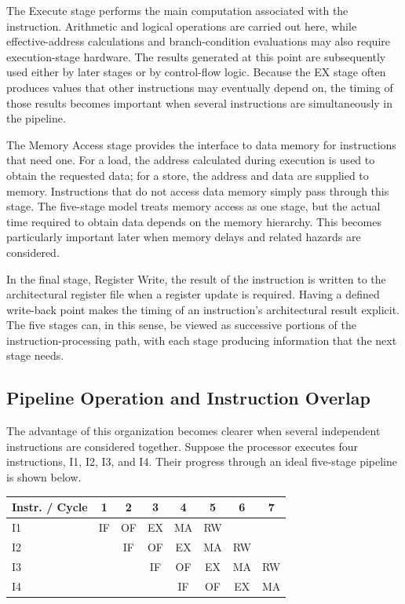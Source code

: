 \documentclass[12pt,a4paper]{report}
\begin{document}
The Execute stage performs the main computation associated with the instruction. Arithmetic and logical operations are carried out here, while effective-address calculations and branch-condition evaluations may also require execution-stage hardware. The results generated at this point are subsequently used either by later stages or by control-flow logic. Because the EX stage often produces values that other instructions may eventually depend on, the timing of those results becomes important when several instructions are simultaneously in the pipeline.

The Memory Access stage provides the interface to data memory for instructions that need one. For a load, the address calculated during execution is used to obtain the requested data; for a store, the address and data are supplied to memory. Instructions that do not access data memory simply pass through this stage. The five-stage model treats memory access as one stage, but the actual time required to obtain data depends on the memory hierarchy. This becomes particularly important later when memory delays and related hazards are considered.

In the final stage, Register Write, the result of the instruction is written to the architectural register file when a register update is required. Having a defined write-back point makes the timing of an instruction's architectural result explicit. The five stages can, in this sense, be viewed as successive portions of the instruction-processing path, with each stage producing information that the next stage needs.~\cite{sarangi}

\subsection{Pipeline Operation and Instruction Overlap}

The advantage of this organization becomes clearer when several independent instructions are considered together. Suppose the processor executes four instructions, I1, I2, I3, and I4. Their progress through an ideal five-stage pipeline is shown below.

\begin{center}
\begin{tabular}{lccccccc}
\toprule
Instr. / Cycle & 1 & 2 & 3 & 4 & 5 & 6 & 7 \\
\midrule
I1 & IF & OF & EX & MA & RW & & \\
I2 & & IF & OF & EX & MA & RW & \\
I3 & & & IF & OF & EX & MA & RW \\
I4 & & & & IF & OF & EX & MA \\
\bottomrule
\end{tabular}
\end{center}
\end{document}
